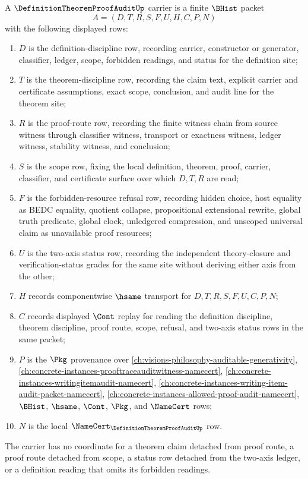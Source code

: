 \begin{definition}
\label{def:definition-theorem-proof-audit-carrier}
A $\DefinitionTheoremProofAuditUp$ carrier is a finite $\BHist$ packet
$$
A=(D,T,R,S,F,U,H,C,P,N)
$$
with the following displayed rows:
\begin{enumerate}
\item $D$ is the definition-discipline row, recording carrier, constructor or generator, classifier, ledger, scope, forbidden readings, and status for the definition site;
\item $T$ is the theorem-discipline row, recording the claim text, explicit carrier and certificate assumptions, exact scope, conclusion, and audit line for the theorem site;
\item $R$ is the proof-route row, recording the finite witness chain from source witness through classifier witness, transport or exactness witness, ledger witness, stability witness, and conclusion;
\item $S$ is the scope row, fixing the local definition, theorem, proof, carrier, classifier, and certificate surface over which $D,T,R$ are read;
\item $F$ is the forbidden-resource refusal row, recording hidden choice, host equality as BEDC equality, quotient collapse, propositional extensional rewrite, global truth predicate, global clock, unledgered compression, and unscoped universal claim as unavailable proof resources;
\item $U$ is the two-axis status row, recording the independent theory-closure and verification-status grades for the same site without deriving either axis from the other;
\item $H$ records componentwise $\hsame$ transport for $D,T,R,S,F,U,C,P,N$;
\item $C$ records displayed $\Cont$ replay for reading the definition discipline, theorem discipline, proof route, scope, refusal, and two-axis status rows in the same packet;
\item $P$ is the $\Pkg$ provenance over \autoref{ch:visions-philosophy-auditable-generativity}, \autoref{ch:concrete-instances-prooftraceauditwitness-namecert}, \autoref{ch:concrete-instances-writingitemaudit-namecert}, \autoref{ch:concrete-instances-writing-item-audit-packet-namecert}, \autoref{ch:concrete-instances-allowed-proof-audit-namecert}, $\BHist$, $\hsame$, $\Cont$, $\Pkg$, and $\NameCert$ rows;
\item $N$ is the local $\NameCert_{\DefinitionTheoremProofAuditUp}$ row.
\end{enumerate}
The carrier has no coordinate for a theorem claim detached from proof route, a proof route detached from scope, a status row detached from the two-axis ledger, or a definition reading that omits its forbidden readings.
\end{definition}

